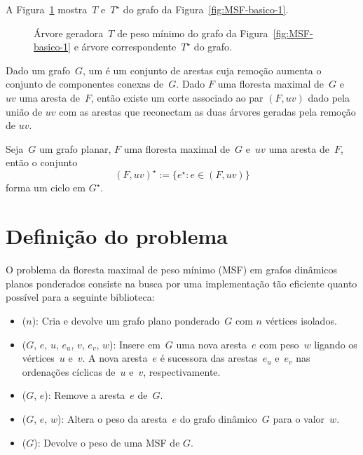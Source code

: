 A Figura~\ref{fig:MSF-figura-2} mostra~$T$ e~$T^\star$ do grafo da Figura~\ref{fig:MSF-basico-1}.

\begin{figure}[htb]
\scalebox{1.5}{
\centering

}
\caption{Árvore geradora~$T$ de peso mínimo do grafo da Figura~\ref{fig:MSF-basico-1} e árvore correspondente~$T^\star$ do grafo.}
\label{fig:MSF-figura-2}
\end{figure}



Dado um grafo~$G$, um  é um conjunto de arestas cuja remoção aumenta o conjunto de componentes conexas de~$G$.
Dado $F$ uma floresta maximal de~$G$ e~$uv$ uma aresta de~$F$, então existe um corte associado ao par $(F, uv)$ dado pela união de $uv$ com as arestas que reconectam as duas árvores geradas pela remoção de $uv$.


\begin{theorem}
\label{teo:cutset}
Seja~$G$ um grafo planar, $F$ uma floresta maximal de~$G$ e~$uv$ uma aresta de~$F$, então o conjunto
$$
(F, uv)^\star := \{e^\star:e\in (F, uv)\}
$$
forma um ciclo em $G^\star$.
\end{theorem}


\section{Definição do problema}
\label{sec:definition-MSF}
O problema da floresta maximal de peso mínimo (MSF) em grafos dinâmicos planos ponderados consiste na busca por uma implementação tão eficiente quanto possível para a seguinte biblioteca:

\begin{itemize}
\item \MSFCreate($n$): Cria e devolve um grafo plano ponderado~$G$ com $n$ vértices isolados.
\item \MSFaddEdge($G$, $e$, $u$, $e_u$, $v$, $e_v$, $w$): Insere em~$G$ uma nova aresta~$e$ com peso~$w$ ligando os vértices~$u$ e~$v$. A nova aresta~$e$ é sucessora das arestas~$e_u$ e~$e_v$ nas ordenações cíclicas de~$u$ e~$v$, respectivamente.
\item \MSFdelEdge($G$, $e$): Remove a aresta~$e$ de~$G$.
\item \MSFupdate($G$, $e$, $w$): Altera o peso da aresta~$e$ do grafo dinâmico~$G$ para o valor~$w$.
\item \MSFweight($G$): Devolve o peso de uma MSF de $G$.
\end{itemize}


